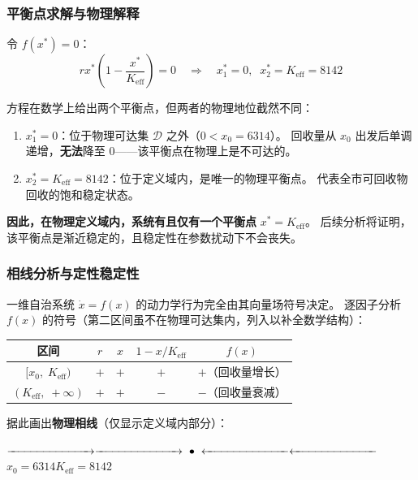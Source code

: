 \documentclass[12pt,a4paper]{ctexart}
\begin{document}
\subsubsection{平衡点求解与物理解释}

令 $f(x^*) = 0$：
\begin{equation}
r x^* \left(1 - \frac{x^*}{K_{\text{eff}}}\right) = 0
\quad\Rightarrow\quad x^*_1 = 0,\;\; x^*_2 = K_{\text{eff}} = 8142
\end{equation}

方程在数学上给出两个平衡点，但两者的物理地位截然不同：
\begin{enumerate}
  \item $x^*_1 = 0$：位于物理可达集 $\mathcal{D}$ 之外（$0 < x_0 = 6314$）。
        回收量从 $x_0$ 出发后单调递增，\textbf{无法}降至 $0$——该平衡点在物理上是不可达的。
  \item $x^*_2 = K_{\text{eff}} = 8142$：位于定义域内，是唯一的物理平衡点。
        代表全市可回收物回收的饱和稳定状态。
\end{enumerate}

\textbf{因此，在物理定义域内，系统有且仅有一个平衡点} $x^* = K_{\text{eff}}$。
后续分析将证明，该平衡点是渐近稳定的，且稳定性在参数扰动下不会丧失。

\subsubsection{相线分析与定性稳定性}

一维自治系统 $\dot{x} = f(x)$ 的动力学行为完全由其向量场符号决定。
逐因子分析 $f(x)$ 的符号（第二区间虽不在物理可达集内，列入以补全数学结构）：

\begin{center}
\begin{tabular}{c|c|c|c|c}
\toprule
区间 & $r$ & $x$ & $1 - x/K_{\text{eff}}$ & $f(x)$ \\
\midrule
$[x_0,\; K_{\text{eff}})$ & $+$ & $+$ & $+$ & $+$（回收量增长） \\
$(K_{\text{eff}},\; +\infty)$ & $+$ & $+$ & $-$ & $-$（回收量衰减） \\
\bottomrule
\end{tabular}
\end{center}

据此画出\textbf{物理相线}（仅显示定义域内部分）：
\begin{center}
$\xrightarrow{\hspace{2.5cm}} \xrightarrow{\hspace{2.5cm}}
\;\bullet\; \xleftarrow{\hspace{2.5cm}} \xleftarrow{\hspace{2.5cm}}$ \\[4pt]
$x_0 = 6314$\hspace{2cm}$K_{\text{eff}} = 8142$\hspace{2cm}
\end{center}
\end{document}
